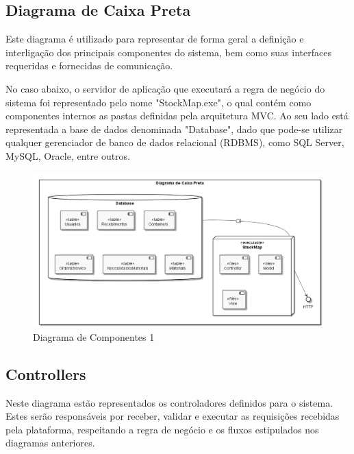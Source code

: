 \documentclass[rascunho,xindy,acronym,symbols]{fei}
\begin{document}
\subsection{Diagrama de Caixa Preta}

Este diagrama é utilizado para representar de forma geral a definição e interligação dos principais componentes do sistema, bem como suas interfaces requeridas e fornecidas de comunicação.

No caso abaixo, o servidor de aplicação que executará a regra de negócio do sistema foi representado pelo nome "StockMap.exe", o qual contém como componentes internos as pastas definidas pela arquitetura MVC. Ao seu lado está representada a base de dados denominada "Database", dado que pode-se utilizar qualquer gerenciador de banco de dados relacional (RDBMS), como SQL Server, MySQL, Oracle, entre outros.

\begin{figure}[H]
    \centering
    \includegraphics[scale=0.6, width=400pt]{./Images/Diagrama_de_Componentes.png}
    \caption{Diagrama de Componentes 1}
    \label{fig:diag_componentes}
\end{figure}

\subsection{Controllers}

Neste diagrama estão representados os controladores definidos para o sistema. Estes serão responsáveis por receber, validar e executar as requisições recebidas pela plataforma, respeitando a regra de negócio e os fluxos estipulados nos diagramas anteriores.
\end{document}
